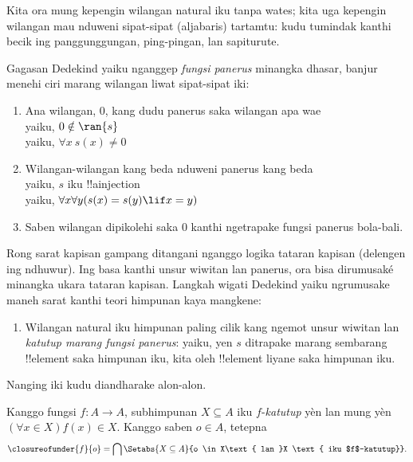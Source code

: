 \documentclass[../../../include/open-logic-section]{subfiles}
\begin{document}

Kita ora mung kepengin wilangan natural iku tanpa wates; kita uga
kepengin wilangan mau nduweni sipat-sipat (aljabaris) tartamtu: kudu
tumindak kanthi becik ing panggunggungan, ping-pingan, lan sapiturute.

Gagasan Dedekind yaiku nganggep \emph{fungsi panerus} minangka
dhasar, banjur menehi ciri marang wilangan liwat sipat-sipat iki:
\begin{enumerate}
	\item Ana wilangan, $0$, kang dudu panerus saka wilangan apa wae
	\\yaiku, $0 \notin \ran{s}$
	\\yaiku, $\forall x\ s(x) \neq 0$
	\item Wilangan-wilangan kang beda nduweni panerus kang beda
	\\yaiku, $s$ iku !!a{injection}
	\\yaiku, $\forall x \forall y (s(x) = s(y) \lif x = y)$
	\item{} Saben wilangan dipikolehi saka
	$0$ kanthi ngetrapake fungsi panerus bola-bali.
\end{enumerate}
Rong sarat kapisan gampang ditangani nganggo logika tataran kapisan
(delengen ing ndhuwur). Ing basa kanthi unsur wiwitan lan panerus, 
ora bisa dirumusaké minangka ukara tataran kapisan. Langkah wigati Dedekind
yaiku ngrumusake maneh sarat  kanthi teori
himpunan kaya mangkene:
\begin{enumerate}
	\item[3$'$.] Wilangan natural iku himpunan paling cilik
	kang ngemot unsur wiwitan lan \emph{katutup marang fungsi panerus}: yaiku, yen $s$ ditrapake
	marang sembarang !!{element} saka himpunan iku, kita oleh
	!!{element} liyane saka himpunan iku.
\end{enumerate}
Nanging iki kudu diandharake alon-alon.

\begin{defn}
	Kanggo fungsi $f\colon A\to A$, subhimpunan $X\subseteq A$ iku
	$f$-\emph{katutup} {yèn lan mung yèn} $(\forall x \in X)f(x) \in X$.
	Kanggo saben $o\in A$, tetepna
	$$\closureofunder{f}{o} = \bigcap\Setabs{X\subseteq A}{o \in X\text{ lan }X
	\text{ iku $f$-katutup}}.$$
\end{defn}
\end{document}
